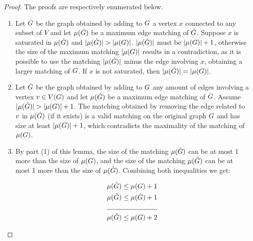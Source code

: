 \documentclass[msc,english,table,xcdraw]{ppgccufmg}
\begin{document}
\begin{proof}
The proofs are respectively enumerated below.
    \begin{enumerate}
        \item Let $\dot{G}$ be the graph obtained by adding to $G$ a vertex $x$ connected to any subset of $V$ and let $\mu(\dot{G})$ be a maximum edge matching of $\dot{G}$.
Suppose $x$ is saturated in $\mu(\dot{G})$ and $|\mu(\dot{G})| > |\mu(G)|$. 
$|\mu(\dot{G})|$ must be $|\mu(G)| + 1$, otherwise the size of the maximum matching $|\mu(G)|$ results in a contradiction, as it is possible to use the matching 
$|\mu(\dot{G})|$ minus the edge involving $x$, obtaining a 
larger matching of $G$.
If $x$ is not saturated, then $|\mu(\dot{G})| = |\mu(G)|$.
        \item Let $\dot{G}$ be the graph obtained by adding  to $G$ any amount of  
edges involving a vertex $v \in V(G)$ and let $\mu(\dot{G})$ be a 
maximum edge matching of $\dot{G}$.
Assume $|\mu(\dot{G})| > |\mu(G)| + 1$.
The matching obtained by removing the edge related to $v$ in 
$\mu(\dot{G})$ (if it exists) is a valid matching on the original graph $G$ and has
size at least $|\mu(G)| + 1$, which contradicts the maximality of the matching of $\mu(G)$.
        \item By part (1) of this lemma, the size of the matching 
        $\mu(\dot{G})$ can be at most 1 more than the size of $\mu(G)$, and the size of the matching $\mu(\ddot{G})$ can be at most 1 more than the size of $\mu(\dot{G})$.
        Combining both inequalities we get:
        
            \begin{alignat}{2}
            \centering
            &\matchingOf{\sub {\graphG}} \leq \matchingOf{\graphG} + 1 \label{equ:matching_sum:1}\\
            &\matchingOf{\ssub{\graphG}} \leq \matchingOf{\sub{\graphG}} + 1 \label{equ:matching_sum:2}\\ 
            \cline{1-2}
            &\matchingOf{\ssub{\graphG}} \leq \matchingOf{\graphG} + 2 \label{equ:matching_sum:3}
            \end{alignat}
    \end{enumerate}
\end{proof}
\end{document}

